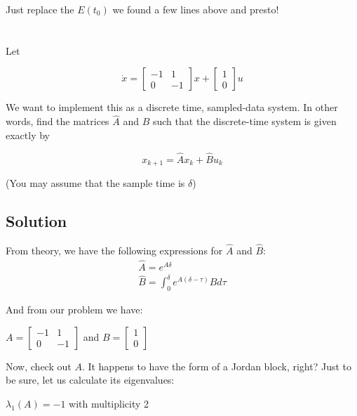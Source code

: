 \documentclass[10pt,a4paper]{article}
\begin{document}
\medskip

Just replace the $E(t_{0})$ we found a few lines above and presto!

\section{}
Let

\[ \dot{x} =
\begin{bmatrix}
-1 & 1 \\
0 & -1
\end{bmatrix}x + 
\begin{bmatrix}
1 \\
0
\end{bmatrix}u
\]

We want to implement this as a discrete time, sampled-data system. In other words, find the matrices $\hat{A}$ and $\hat{B}$ such that the discrete-time system is given exactly by

\[ x_{k+1} = \hat{A}x_{k} + \hat{B}u_{k} \]

(You may assume that the sample time is $\delta$)
\subsection*{Solution}
From theory, we have the following expressions for $\hat{A}$ and $\hat{B}$:
\begin{equation} 
\begin{matrix}
\hat{A} = e^{A \delta} \\
\hat{B} = \displaystyle \int_{0}^{\delta} e^{A(\delta - \tau)}Bd\tau 
\end{matrix}
\label{Eq:P4-General}
\end{equation}

And from our problem we have:
\begin{center}
$A = \begin{bmatrix}-1 & 1 \\ 0 & -1 \end{bmatrix}$ and $B = \begin{bmatrix} 1 \\ 0 \end{bmatrix}$
\end{center}

Now, check out $A$. It happens to have the form of a Jordan block, right? Just to be sure, let us calculate its eigenvalues:
\begin{center}
$ \lambda_{1}(A) = -1$ with multiplicity 2
\end{center}
\end{document}
